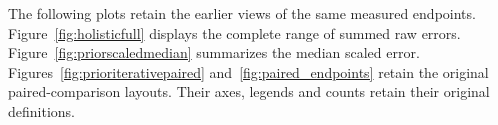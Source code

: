 The following plots retain the earlier views of the same measured endpoints. Figure~\ref{fig:holisticfull} displays the complete range of summed raw errors. Figure~\ref{fig:priorscaledmedian} summarizes the median scaled error. Figures~\ref{fig:prioriterativepaired} and~\ref{fig:paired_endpoints} retain the original paired-comparison layouts. Their axes, legends and counts retain their original definitions.


\clearpage


\clearpage


